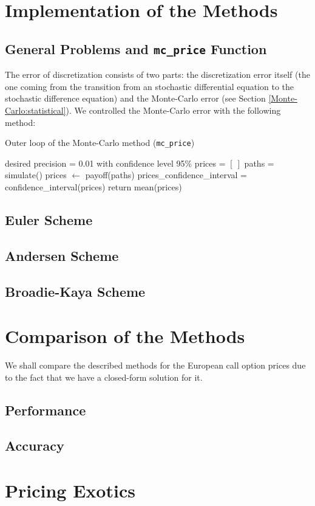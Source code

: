 \chapter{Implementation of the Methods}
    \section{General Problems and \texttt{mc\_price} Function}
        The error of discretization consists of two parts: the discretization error itself 
        (the one coming from the transition from an stochastic differential equation to the 
        stochastic difference equation) and the Monte-Carlo error (see Section \ref{Monte-Carlo:statistical}).
        We controlled the Monte-Carlo error with the following method:
        \begin{algorithm}
            \caption{Outer loop of the Monte-Carlo method (\texttt{mc\_price})}
            \label{alg:outer_loop}
            \begin{algorithmic}
                \State desired precision = 0.01 with confidence level 95\%
                \State prices = $\left[ \ \right]$
                    \State paths = simulate()
                    \State prices $\gets$ payoff(paths)
                    \State prices\_confidence\_interval = confidence\_interval(prices)
                \EndWhile
                \State return mean(prices)
            \end{algorithmic}
        \end{algorithm}



    \section{Euler Scheme}

    \section{Andersen Scheme}

    \section{Broadie-Kaya Scheme}


\chapter{Comparison of the Methods}
    We shall compare the described methods for the European call option prices due to the fact that we have a closed-form solution for it.
    \section{Performance}

    \section{Accuracy}

\chapter{Pricing Exotics}